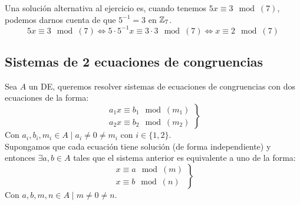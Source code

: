 \begin{ejemplo}
\begin{enumerate}
    \noindent Una solución alternativa al ejercicio es, cuando tenemos $5x\equiv 3\mod(7)$, podemos darnos cuenta de que $5^{-1} = 3$ en $\mathbb Z_7$.
    $$5x\equiv 3\mod(7) \Leftrightarrow 5\cdot 5^{-1}x\equiv 3\cdot 3\mod(7) \Leftrightarrow x\equiv 2 \mod(7)$$
\end{enumerate}
\end{ejemplo}

\subsection{Sistemas de 2 ecuaciones de congruencias}
\noindent Sea $A$ un DE, queremos resolver sistemas de ecuaciones de congruencias con dos ecuaciones de la forma:
$$\left. \begin{array}{l}
        a_1x\equiv b_1\mod(m_1) \\
        a_2x\equiv b_2\mod(m_2)
    \end{array} \right\}$$
Con $a_i,b_i,m_i \in A \mid a_i\neq 0 \neq m_i$ con $i \in \{1,2\}$.\\


\noindent Supongamos que cada ecuación tiene solución (de forma independiente) y entonces $\exists a,b \in A$ tales que el sistema
anterior es equivalente a uno de la forma:
$$\left. \begin{array}{l}
        x\equiv a\mod(m) \\
        x\equiv b\mod(n)
    \end{array} \right\}$$
Con $a,b,m,n \in A \mid m\neq0\neq n$.

